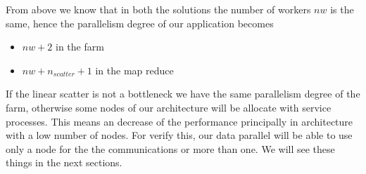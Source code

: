 From above we know that in both the solutions the number of workers $nw$ is the same, hence the parallelism degree of our application becomes
\begin{itemize}
\item $nw+2$ in the farm
\item $nw+n_{scatter}+1$ in the map reduce
\end{itemize}
If the linear scatter is not a bottleneck we have the same parallelism degree of the farm, otherwise some nodes of our architecture will be allocate with service processes. This means an decrease of the performance principally in architecture with a low number of nodes. For verify this, our data parallel will be able to use only a node for the the communications or more than one. We will see these things in the next sections.